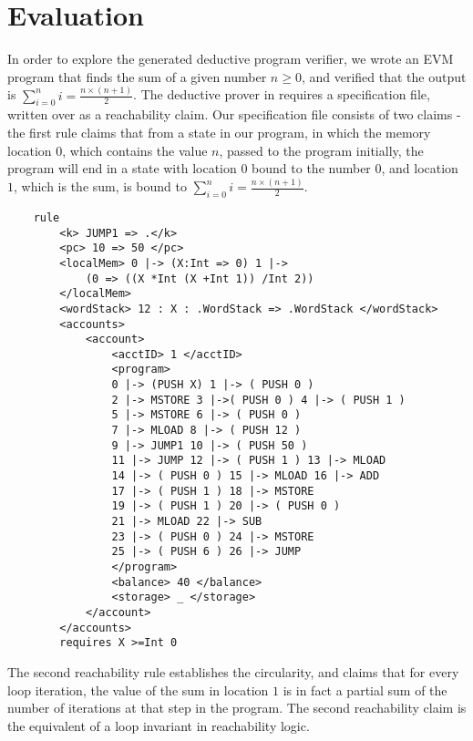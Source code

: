 \section{Evaluation}
In order to explore the generated deductive program verifier, we wrote an EVM
program that finds the sum of a given number $n \geq 0 $, and verified that the
output is $ \sum_{i = 0}^{n} i =  \frac{n \times  (n + 1 )}{2}$. The deductive
prover in \K{} requires a specification file, written over as a reachability
claim. Our specification file consists of two claims - the first rule claims
that from a state in our program, in which the memory location $0$, which
contains the value $n$, passed to the program initially, the program will end in
a state with location $0$ bound to the number $0$, and location $1$, which is
the sum, is bound to $ \sum_{i = 0}^{n} i = \frac{n \times  (n + 1 )}{2} $.

\begin{verbatim}
    rule
        <k> JUMP1 => .</k>
        <pc> 10 => 50 </pc>
        <localMem> 0 |-> (X:Int => 0) 1 |->
            (0 => ((X *Int (X +Int 1)) /Int 2))
        </localMem>
        <wordStack> 12 : X : .WordStack => .WordStack </wordStack>
        <accounts>
            <account>
	            <acctID> 1 </acctID>
	            <program>
                0 |-> (PUSH X) 1 |-> ( PUSH 0 )
                2 |-> MSTORE 3 |->( PUSH 0 ) 4 |-> ( PUSH 1 )
                5 |-> MSTORE 6 |-> ( PUSH 0 )
                7 |-> MLOAD 8 |-> ( PUSH 12 )
                9 |-> JUMP1 10 |-> ( PUSH 50 )
                11 |-> JUMP 12 |-> ( PUSH 1 ) 13 |-> MLOAD
                14 |-> ( PUSH 0 ) 15 |-> MLOAD 16 |-> ADD
                17 |-> ( PUSH 1 ) 18 |-> MSTORE
                19 |-> ( PUSH 1 ) 20 |-> ( PUSH 0 )
                21 |-> MLOAD 22 |-> SUB
                23 |-> ( PUSH 0 ) 24 |-> MSTORE
                25 |-> ( PUSH 6 ) 26 |-> JUMP
                </program>
	            <balance> 40 </balance>
	            <storage> _ </storage>
            </account>
        </accounts>
        requires X >=Int 0
\end{verbatim}

The second reachability rule establishes the circularity, and claims that for
every loop iteration, the value of the sum in location $1$ is in fact a partial
sum of the number of iterations at that step in the program. The second
reachability claim is the equivalent of a loop invariant in reachability logic.


